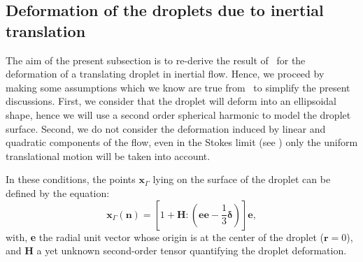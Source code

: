 
\subsection{Deformation of the droplets due to inertial translation}
\label{sec:deformation}

The aim of the present subsection is to re-derive the result of~\citet{taylor1964deformation} for the deformation of a translating droplet in inertial flow.
Hence, we proceed by making some assumptions which we know are true from~\citet{taylor1964deformation} to simplify the present discussions.  
First, we consider that the droplet will deform into an ellipsoidal shape, hence we will use a second order spherical harmonic to model the droplet surface. 
Second, we do not consider the deformation induced by linear and quadratic components of the flow, even in the Stokes limit (see \citet{fintzi2025averaged}) only the uniform translational motion will be taken into account. 

In these conditions, the points $\textbf{x}_\Gamma$ lying on the surface of the droplet can be defined by the equation\citep{nadim1991motion,nadim1996concise}: 
\begin{equation}
    \textbf{x}_\Gamma(\textbf{n}) = [1+ \textbf{H}:(\textbf{e} \textbf{e}- \frac{1}{3}\bm\delta)] \textbf{e}, 
    \label{eq:r_gamma}
\end{equation}
with, \textbf{e} the radial unit vector whose origin is at the center of the droplet ($\textbf{r}=0$), and \textbf{H} a yet unknown second-order tensor quantifying the droplet deformation.

